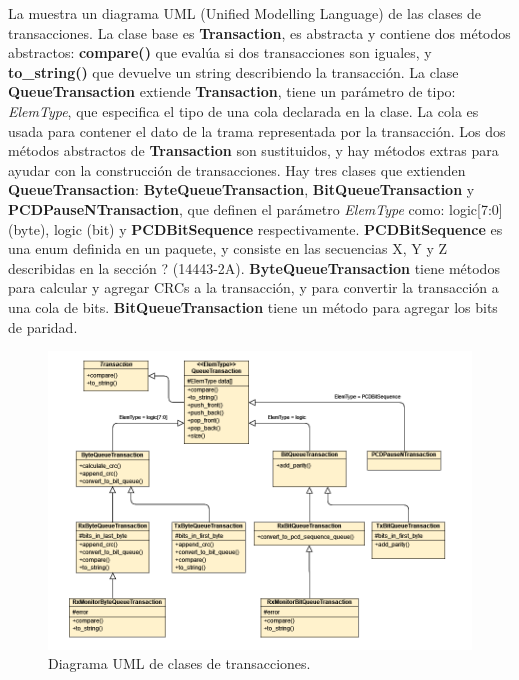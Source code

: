 \documentclass[a4paper, twoside, 11pt]{report}
\begin{document}
La  muestra un diagrama UML (Unified Modelling Language) de las clases de transacciones. La clase base es \textbf{Transaction}, es abstracta y contiene dos métodos abstractos: \textbf{compare()} que evalúa si dos transacciones son iguales, y \textbf{to\_string()} que devuelve un string describiendo la transacción. La clase \textbf{QueueTransaction} extiende \textbf{Transaction}, tiene un parámetro de tipo: \textit{ElemType}, que especifica el tipo de una cola declarada en la clase. La cola es usada para contener el dato de la trama representada por la transacción. Los dos métodos abstractos de \textbf{Transaction} son sustituidos, y hay métodos extras para ayudar con la construcción de transacciones. Hay tres clases que extienden \textbf{QueueTransaction}: \textbf{ByteQueueTransaction}, \textbf{BitQueueTransaction} y \textbf{PCDPauseNTransaction}, que definen el parámetro \textit{ElemType} como: logic[7:0] (byte), logic (bit) y \textbf{PCDBitSequence} respectivamente. \textbf{PCDBitSequence} es una enum definida en un paquete, y consiste en las secuencias X, Y y Z describidas en la sección ? (14443-2A). \textbf{ByteQueueTransaction} tiene métodos para calcular y agregar CRCs a la transacción, y para convertir la transacción a una cola de bits. \textbf{BitQueueTransaction} tiene un método para agregar los bits de paridad.

\begin{figure}[htb]
  \centering
  \includegraphics[width=1.0\textwidth]{./img/transactions_uml.vpd}
  \caption{Diagrama UML de clases de transacciones.}
  \label{fig:transaction_uml}
\end{figure}
\end{document}
